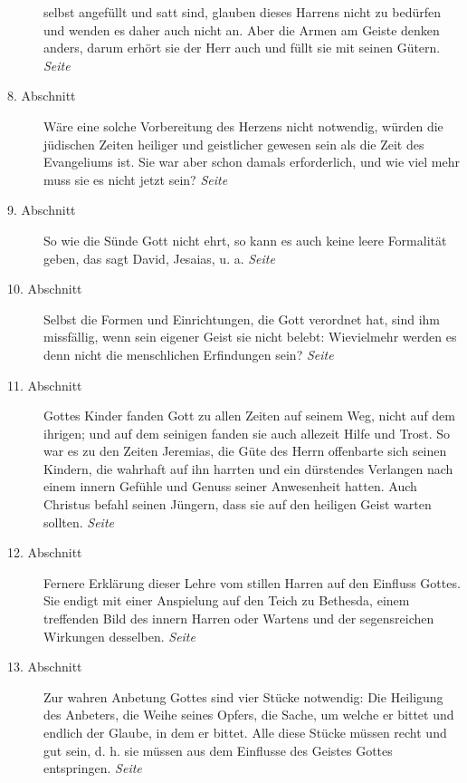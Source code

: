 \begin{description}
selbst angefüllt und satt sind, glauben dieses Harrens nicht zu bedürfen und
wenden es daher auch nicht an. Aber die Armen am Geiste denken anders, darum
erhört sie der Herr auch und füllt sie mit seinen Gütern.
\dotfill \textit{Seite~\pageref{kap6_ab7}}\\
\item[8. Abschnitt] Wäre eine solche
Vorbereitung des Herzens nicht notwendig, würden die jüdischen Zeiten heiliger
und geistlicher gewesen sein als die Zeit des Evangeliums ist. Sie war aber
schon damals erforderlich, und wie viel mehr muss sie es nicht jetzt sein?
\dotfill \textit{Seite~\pageref{kap6_ab8}}\\
\item[9. Abschnitt] So wie die Sünde Gott nicht ehrt, so kann es auch keine
leere Formalität geben, das sagt David, Jesaias, u. a.
\dotfill \textit{Seite~\pageref{kap6_ab9}}\\
\item[10. Abschnitt] Selbst die Formen und Einrichtungen, die Gott verordnet
hat, sind ihm missfällig, wenn sein eigener Geist sie nicht belebt: Wievielmehr
werden es denn nicht die menschlichen Erfindungen sein?
\dotfill \textit{Seite~\pageref{kap6_ab10}}\\
\item[11. Abschnitt] Gottes Kinder fanden Gott zu allen Zeiten auf seinem Weg,
nicht auf dem ihrigen; und auf dem seinigen fanden sie auch allezeit Hilfe und
Trost. So war es zu den Zeiten Jeremias, die Güte des Herrn offenbarte sich
seinen Kindern, die wahrhaft auf ihn harrten und ein dürstendes Verlangen nach
einem innern Gefühle und Genuss seiner Anwesenheit hatten. Auch Christus befahl
seinen Jüngern, dass sie auf den heiligen Geist warten sollten.
\dotfill \textit{Seite~\pageref{kap6_ab11}}\\
\item[12. Abschnitt] Fernere Erklärung dieser Lehre vom stillen Harren auf den
Einfluss Gottes. Sie endigt mit einer Anspielung auf den Teich zu Bethesda,
einem treffenden Bild des innern Harren oder Wartens und der segensreichen
Wirkungen desselben.
\dotfill \textit{Seite~\pageref{kap6_ab12}}\\
\item[13. Abschnitt] Zur wahren Anbetung Gottes sind vier Stücke notwendig: Die
Heiligung des Anbeters, die Weihe seines Opfers, die Sache, um welche er bittet
und endlich der Glaube, in dem er bittet. Alle diese Stücke müssen recht und gut
sein, d. h. sie müssen aus dem Einflusse des Geistes Gottes entspringen.
\dotfill \textit{Seite~\pageref{kap6_ab13}}\\

\end{description}
